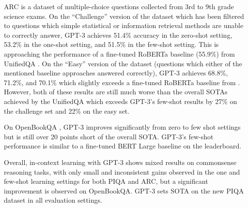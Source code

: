 \documentclass{article}
\begin{document}
ARC \cite{Clark2018ThinkYH} is a dataset of multiple-choice questions collected from 3rd to 9th grade science exams. On the ``Challenge'' version of the dataset which has been filtered to questions which simple statistical or information retrieval methods are unable to  correctly answer, GPT-3 achieves 51.4\% accuracy in the zero-shot setting, 53.2\% in the one-shot setting, and 51.5\% in the few-shot setting. This is approaching the performance of a fine-tuned RoBERTa baseline (55.9\%) from UnifiedQA \cite{khashabi2020unifiedqa}. On the ``Easy'' version of the dataset (questions which either of the mentioned baseline approaches answered correctly), GPT-3 achieves 68.8\%, 71.2\%, and 70.1\% which slightly exceeds a fine-tuned RoBERTa baseline from \cite{khashabi2020unifiedqa}. However, both of these results are still much worse than the overall SOTAs achieved by the UnifiedQA which exceeds GPT-3’s few-shot results by 27\% on the challenge set and 22\% on the easy set.

On OpenBookQA \cite{Mihaylov2018CanAS}, GPT-3 improves significantly from zero to few shot settings but is still over 20 points short of the overall SOTA. GPT-3's few-shot performance is similar to a fine-tuned BERT Large baseline on the leaderboard.

Overall, in-context learning with GPT-3 shows mixed results on commonsense reasoning tasks, with only small and inconsistent gains observed in the one and few-shot learning settings for both PIQA and ARC, but a significant improvement is observed on OpenBookQA. GPT-3 sets SOTA on the new PIQA dataset in all evaluation settings.
\end{document}
